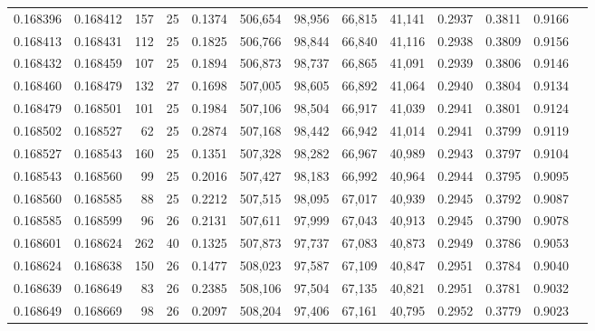 \begin{tabular}{rrrrrrrrrrrrr}
0.168396 & 0.168412 & 157 &  25 &                                     0.1374 & 506,654 &  98,956 &  66,815 &  41,141 & 0.2937 & 0.3811 & 0.9166 \\
0.168413 & 0.168431 & 112 &  25 &                                     0.1825 & 506,766 &  98,844 &  66,840 &  41,116 & 0.2938 & 0.3809 & 0.9156 \\
0.168432 & 0.168459 & 107 &  25 &                                     0.1894 & 506,873 &  98,737 &  66,865 &  41,091 & 0.2939 & 0.3806 & 0.9146 \\
0.168460 & 0.168479 & 132 &  27 &                                     0.1698 & 507,005 &  98,605 &  66,892 &  41,064 & 0.2940 & 0.3804 & 0.9134 \\
0.168479 & 0.168501 & 101 &  25 &                                     0.1984 & 507,106 &  98,504 &  66,917 &  41,039 & 0.2941 & 0.3801 & 0.9124 \\
0.168502 & 0.168527 &  62 &  25 &                                     0.2874 & 507,168 &  98,442 &  66,942 &  41,014 & 0.2941 & 0.3799 & 0.9119 \\
0.168527 & 0.168543 & 160 &  25 &                                     0.1351 & 507,328 &  98,282 &  66,967 &  40,989 & 0.2943 & 0.3797 & 0.9104 \\
0.168543 & 0.168560 &  99 &  25 &                                     0.2016 & 507,427 &  98,183 &  66,992 &  40,964 & 0.2944 & 0.3795 & 0.9095 \\
0.168560 & 0.168585 &  88 &  25 &                                     0.2212 & 507,515 &  98,095 &  67,017 &  40,939 & 0.2945 & 0.3792 & 0.9087 \\
0.168585 & 0.168599 &  96 &  26 &                                     0.2131 & 507,611 &  97,999 &  67,043 &  40,913 & 0.2945 & 0.3790 & 0.9078 \\
0.168601 & 0.168624 & 262 &  40 &                                     0.1325 & 507,873 &  97,737 &  67,083 &  40,873 & 0.2949 & 0.3786 & 0.9053 \\
0.168624 & 0.168638 & 150 &  26 &                                     0.1477 & 508,023 &  97,587 &  67,109 &  40,847 & 0.2951 & 0.3784 & 0.9040 \\
0.168639 & 0.168649 &  83 &  26 &                                     0.2385 & 508,106 &  97,504 &  67,135 &  40,821 & 0.2951 & 0.3781 & 0.9032 \\
0.168649 & 0.168669 &  98 &  26 &                                     0.2097 & 508,204 &  97,406 &  67,161 &  40,795 & 0.2952 & 0.3779 & 0.9023 \\

\end{tabular}

